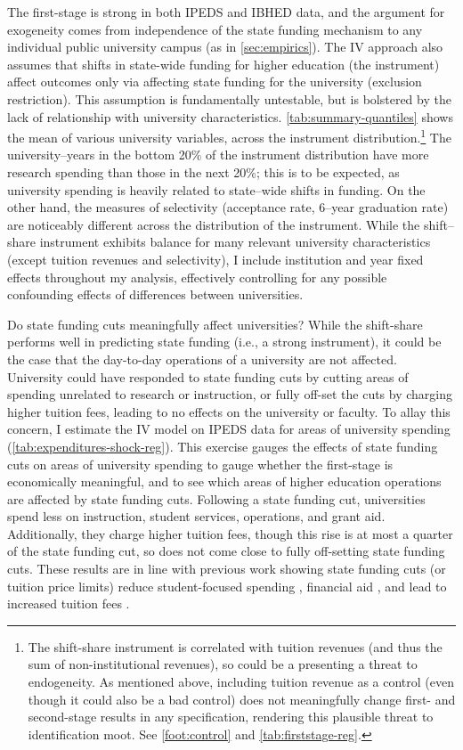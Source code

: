 The first-stage is strong in both IPEDS and IBHED data, and the argument for exogeneity comes from independence of the state funding mechanism to any individual public university campus (as in \autoref{sec:empirics}).
The IV approach also assumes that shifts in state-wide funding for higher education (the instrument) affect outcomes only via affecting state funding for the university (exclusion restriction).
This assumption is fundamentally untestable, but is bolstered by the lack of relationship with university characteristics.
\autoref{tab:summary-quantiles} shows the mean of various university variables, across the instrument distribution.\footnote{
    The shift-share instrument is correlated with tuition revenues (and thus the sum of non-institutional revenues), so could be a presenting a threat to endogeneity.
    As mentioned above, including tuition revenue as a control (even though it could also be a bad control) does not meaningfully change first- and second-stage results in any specification, rendering this plausible threat to identification moot.
    See \autoref{foot:control} and \autoref{tab:firststage-reg}.
}
The university--years in the bottom 20\% of the instrument distribution have more research spending than those in the next 20\%; this is to be expected, as university spending is heavily related to state--wide shifts in funding.
On the other hand, the measures of selectivity (acceptance rate, 6--year graduation rate) are noticeably different across the distribution of the instrument.
While the shift--share instrument exhibits balance for many relevant university characteristics (except tuition revenues and selectivity), I include institution and year fixed effects throughout my analysis, effectively controlling for any possible confounding effects of differences between universities.

Do state funding cuts meaningfully affect universities?
While the shift-share performs well in predicting state funding (i.e., a strong instrument), it could be the case that the day-to-day operations of a university are not affected.
University could have responded to state funding cuts by cutting areas of spending unrelated to research or instruction, or fully off-set the cuts by charging higher tuition fees, leading to no effects on the university or faculty.
To allay this concern, I estimate the IV model on IPEDS data for areas of university spending  (\autoref{tab:expenditures-shock-reg}).
This exercise gauges the effects of state funding cuts on areas of university spending to gauge whether the first-stage is economically meaningful, and to see which areas of higher education operations are affected by state funding cuts.
Following a state funding cut, universities spend less on instruction, student services, operations, and grant aid.
Additionally, they charge higher tuition fees, though this rise is at most a quarter of the state funding cut, so does not come close to fully off-setting state funding cuts.
These results are in line with previous work showing state funding cuts (or tuition price limits) reduce student-focused spending \citep{NBERw23736}, financial aid \citep{miller2022making}, and lead to increased tuition fees \citep{bound2019public,webber2017state}.

